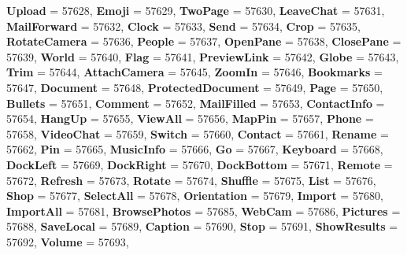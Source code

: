 \begin{DoxyCompactItemize}
{\bfseries Upload} = 57628, 
{\bfseries Emoji} = 57629, 
{\bfseries Two\+Page} = 57630, 
{\bfseries Leave\+Chat} = 57631, 
\newline
{\bfseries Mail\+Forward} = 57632, 
{\bfseries Clock} = 57633, 
{\bfseries Send} = 57634, 
{\bfseries Crop} = 57635, 
\newline
{\bfseries Rotate\+Camera} = 57636, 
{\bfseries People} = 57637, 
{\bfseries Open\+Pane} = 57638, 
{\bfseries Close\+Pane} = 57639, 
\newline
{\bfseries World} = 57640, 
{\bfseries Flag} = 57641, 
{\bfseries Preview\+Link} = 57642, 
{\bfseries Globe} = 57643, 
\newline
{\bfseries Trim} = 57644, 
{\bfseries Attach\+Camera} = 57645, 
{\bfseries Zoom\+In} = 57646, 
{\bfseries Bookmarks} = 57647, 
\newline
{\bfseries Document} = 57648, 
{\bfseries Protected\+Document} = 57649, 
{\bfseries Page} = 57650, 
{\bfseries Bullets} = 57651, 
\newline
{\bfseries Comment} = 57652, 
{\bfseries Mail\+Filled} = 57653, 
{\bfseries Contact\+Info} = 57654, 
{\bfseries Hang\+Up} = 57655, 
\newline
{\bfseries View\+All} = 57656, 
{\bfseries Map\+Pin} = 57657, 
{\bfseries Phone} = 57658, 
{\bfseries Video\+Chat} = 57659, 
\newline
{\bfseries Switch} = 57660, 
{\bfseries Contact} = 57661, 
{\bfseries Rename} = 57662, 
{\bfseries Pin} = 57665, 
\newline
{\bfseries Music\+Info} = 57666, 
{\bfseries Go} = 57667, 
{\bfseries Keyboard} = 57668, 
{\bfseries Dock\+Left} = 57669, 
\newline
{\bfseries Dock\+Right} = 57670, 
{\bfseries Dock\+Bottom} = 57671, 
{\bfseries Remote} = 57672, 
{\bfseries Refresh} = 57673, 
\newline
{\bfseries Rotate} = 57674, 
{\bfseries Shuffle} = 57675, 
{\bfseries List} = 57676, 
{\bfseries Shop} = 57677, 
\newline
{\bfseries Select\+All} = 57678, 
{\bfseries Orientation} = 57679, 
{\bfseries Import} = 57680, 
{\bfseries Import\+All} = 57681, 
\newline
{\bfseries Browse\+Photos} = 57685, 
{\bfseries Web\+Cam} = 57686, 
{\bfseries Pictures} = 57688, 
{\bfseries Save\+Local} = 57689, 
\newline
{\bfseries Caption} = 57690, 
{\bfseries Stop} = 57691, 
{\bfseries Show\+Results} = 57692, 
{\bfseries Volume} = 57693, 
\newline

\end{DoxyCompactItemize}
